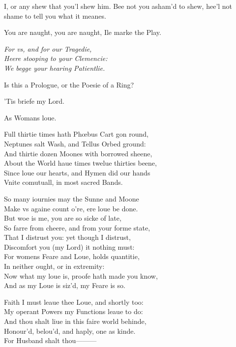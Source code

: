 \documentclass[a5paper,DIV=calc,11pt]{scrbook}
\begin{document}
\begin{drama*}
    \hamspeaks I, or any shew that you'l shew him. Bee not you asham'd to shew, hee'l not shame to tell you what it meanes.
    
    \ophespeaks You are naught, you are naught, Ile marke the Play.
    
    \begin{center}\textit{
    For vs, and for our Tragedie,\\
    Heere stooping to your Clemencie:\\
    We begge your hearing Patientlie.\\
    }\end{center}
    
    \hamspeaks Is this a Prologue, or the Poesie of a Ring?
    
    \ophespeaks 'Tis briefe my Lord.
    
    \hamspeaks As Womans loue.
    
    
    \playking Full thirtie times hath Phœbus Cart gon round,\\
    Neptunes salt Wash, and Tellus Orbed ground:\\
    And thirtie dozen Moones with borrowed sheene,\\
    About the World haue times twelue thirties beene,\\
    Since loue our hearts, and Hymen did our hands\\
    Vnite comutuall, in most sacred Bands.
    
    \playqueen So many iournies may the Sunne and Moone\\
    Make vs againe count o're, ere loue be done.\\
    But woe is me, you are so sicke of late,\\
    So farre from cheere, and from your forme state,\\
    That I distrust you: yet though I distrust,\\
    Discomfort you (my Lord) it nothing must:\\
    For womens Feare and Loue, holds quantitie,\\
    In neither ought, or in extremity:\\
    Now what my loue is, proofe hath made you know,\\
    And as my Loue is siz'd, my Feare is so.
    
    \playking Faith I must leaue thee Loue, and shortly too:\\
    My operant Powers my Functions leaue to do:\\
    And thou shalt liue in this faire world behinde,\\
    Honour'd, belou'd, and haply, one as kinde.\\
    For Husband shalt thou———
    

\end{drama*}
\end{document}

